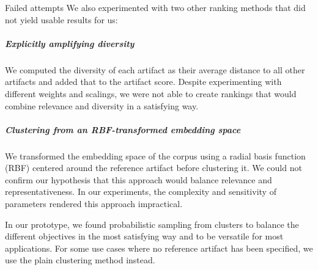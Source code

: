 \begin{genericbox}{Failed attempts}
	We also experimented with two other ranking methods that did not yield usable results for us:

	\subparagraph{Explicitly amplifying diversity}
	We computed the diversity of each artifact as their average distance to all other artifacts and added that to the artifact score.
	Despite experimenting with different weights and scalings, we were not able to create rankings that would combine relevance and diversity in a satisfying way.

	\subparagraph{Clustering from an RBF-transformed embedding space}
	We transformed the embedding space of the corpus using a radial basis function (RBF) centered around the reference artifact before clustering it.
	We could not confirm our hypothesis that this approach would balance relevance and representativeness.
	In our experiments, the complexity and sensitivity of parameters rendered this approach impractical.
\end{genericbox}


In our prototype, we found probabilistic sampling from clusters to balance the different objectives in the most satisfying way and to be versatile for most applications.
For some use cases where no reference artifact has been specified, we use the plain clustering method instead.
